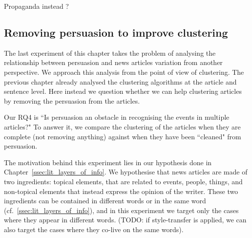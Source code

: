 Propaganda instead ?



\subsection{\statusorange Removing persuasion to improve clustering}
\label{ssec:lp_relationship_removing}

The last experiment of this chapter takes the problem of analysing the relationship between persuasion and news articles variation from another perspective.
We approach this analysis from the point of view of clustering.
The previous chapter already analysed the clustering algorithms at the article and sentence level.
Here instead we question whether we can help clustering articles by removing the persuasion from the articles.

Our RQ4 is ``Is persuasion an obstacle in recognising the events in multiple articles?" To answer it, we compare the clustering of the articles when they are complete (not removing anything) against when they have been ``cleaned" from persuasion.

The motivation behind this experiment lies in our hypothesis done in Chapter~\ref{ssec:lit_layers_of_info}. We hypothesise that news articles are made of two ingredients: topical elements, that are related to events, people, things, and non-topical elements that instead express the opinion of the writer. These two ingredients can be contained in different words or in the same word (cf.~\ref{ssec:lit_layers_of_info}), and in this experiment we target only the cases where they appear in different words. (TODO: if style-transfer is applied, we can also target the cases where they co-live on the same words).


